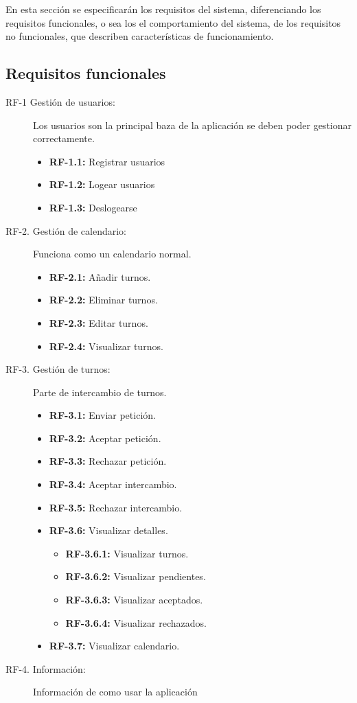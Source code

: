 En esta sección se especificarán los requisitos del sistema, diferenciando los requisitos funcionales, o sea los  el comportamiento del sistema, de los requisitos no funcionales, que describen características de funcionamiento.
\subsection{Requisitos funcionales}\label{r-funcionales}
\begin{description}
    \item[RF-1 Gestión de usuarios:] Los usuarios son la principal baza de la aplicación se deben poder gestionar correctamente.
    \begin{itemize}
         \item \textbf{RF-1.1:} Registrar usuarios
         \item \textbf{RF-1.2:} Logear usuarios
         \item \textbf{RF-1.3:} Deslogearse
    \end{itemize}
   \item[RF-2. Gestión de calendario:] Funciona como un calendario normal.
    \begin{itemize}
         \item \textbf{RF-2.1:} Añadir turnos.
         \item \textbf{RF-2.2:} Eliminar turnos.
         \item \textbf{RF-2.3:} Editar turnos.
         \item \textbf{RF-2.4:} Visualizar turnos.
    \end{itemize}
 	   \item[RF-3. Gestión de turnos:] Parte de intercambio de turnos.
    \begin{itemize}
         \item \textbf{RF-3.1:} Enviar petición.
         \item \textbf{RF-3.2:} Aceptar petición.
         \item \textbf{RF-3.3:} Rechazar petición. 
         \item \textbf{RF-3.4:} Aceptar intercambio.
         \item \textbf{RF-3.5:} Rechazar intercambio.
         \item \textbf{RF-3.6:} Visualizar detalles.
           \begin{itemize}
             \item \textbf{RF-3.6.1:} Visualizar turnos.
             \item \textbf{RF-3.6.2:} Visualizar pendientes.
             \item \textbf{RF-3.6.3:} Visualizar aceptados.
             \item \textbf{RF-3.6.4:} Visualizar rechazados.
           \end{itemize}
         \item \textbf{RF-3.7:} Visualizar calendario.
    \end{itemize}
       
    
    
   \item[RF-4. Información:] Información de como usar la aplicación
\end{description}

